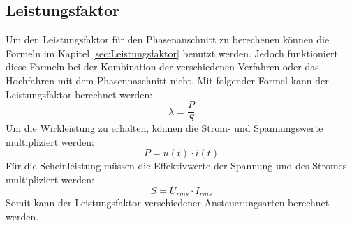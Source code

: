\subsection{Leistungsfaktor}
Um den Leistungsfaktor für den Phasenanschnitt zu berechenen können die Formeln im Kapitel \ref{sec:Leistungsfaktor} benutzt werden. Jedoch funktioniert diese Formeln bei der Kombination der verschiedenen Verfahren oder das Hochfahren mit dem Phasennaschnitt nicht. Mit folgender Formel kann der Leistungsfaktor berechnet werden:
\begin{equation}
\lambda = \frac{P}{S}
\end{equation}
Um die Wirkleistung zu erhalten, können die Strom- und Spannungswerte multipliziert werden:
\begin{equation}
P = u(t) \cdot i(t)
\end{equation}
Für die Scheinleistung müssen die Effektivwerte der Spannung und des Stromes multipliziert werden:
\begin{equation}
S = U_{rms} \cdot I_{rms}
\end{equation}
Somit kann der Leistungsfaktor verschiedener Ansteuerungsarten berechnet werden.

